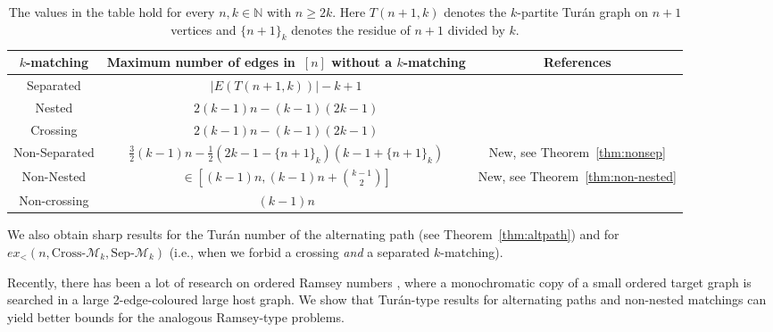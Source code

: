 \documentclass[11pt]{article}
\theoremstyle{definition}
\def\marrow{{\marginpar[\hfill$\longrightarrow$]{$\longleftarrow$}}}
\def\geza#1{{\sc G\'eza says: }{\marrow\sf #1}}
\begin{document}


\begin{table}[h]
\centering
\bgroup
\def\arraystretch{1.75}
\begin{tabular}{|c|c|c|}
\hline
$k$-matching  & Maximum number of edges in~$[n]$ without a $k$-matching & References  \\
\hline
\hline
Separated  & %
    $|E(T(n+1,k))|-k+1$ & \cite{layout}\\
Nested  & $2(k-1)n - (k-1)(2k - 1)$ & \cite{layout}\\
Crossing  & $2(k-1)n-(k-1)(2k - 1)$ & \cite{CapoyleasP}\\
Non-Separated  & $\frac{3}{2}(k-1)n-\frac{1}{2}(2k-1-\{n+1\}_k)(k-1+\{n+1\}_k)$ & New, see Theorem~\ref{thm:nonsep}\\
Non-Nested  & $\in[(k-1)n,(k-1)n+\binom{k-1}{2}]$ & New, see Theorem~\ref{thm:non-nested}\\
Non-crossing   & $(k-1)n$ & \cite{Kupitz}\\
\hline
\end{tabular}
\egroup
\caption{The values in the table hold for every $n,k\in\mathbb N$ with $n\ge 2k$.
Here $T(n+1,k)$ denotes the $k$-partite Tur\'an graph on $n+1$ vertices and $\{n+1\}_k$ denotes the residue of $n+1$ divided by $k$. }%
\label{table:1}
\end{table}

We also obtain sharp results for the Tur\'an number of the alternating path (see Theorem~\ref{thm:altpath}) and for $ex_<(n,\text{Cross-}\mathcal M_k,\text{Sep-}\mathcal M_k)$ (i.e., when we forbid a crossing {\it and} a separated $k$-matching).

Recently, there has been a lot of research on ordered Ramsey numbers \cite{bckk,cfls,tardos}, where a monochromatic copy of a small ordered target graph is searched in a large 2-edge-coloured large host graph.
We show that Tur\'an-type results for alternating paths and non-nested matchings can yield better bounds for the analogous Ramsey-type problems.




\end{document}
